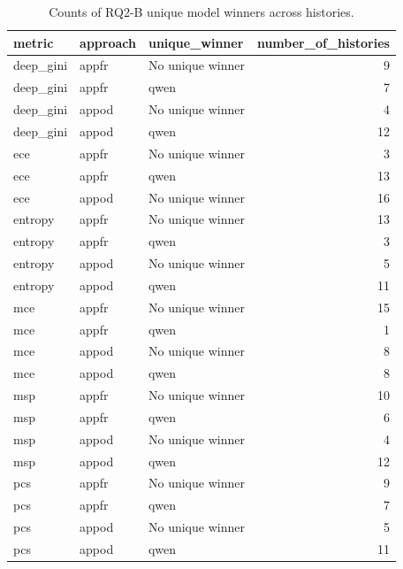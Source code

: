 \begin{table}[tbp]
\caption{Counts of RQ2-B unique model winners across histories.}
\label{tab:rq2b-model-winner-summary}
\begin{tabular}{lllr}
\toprule
metric & approach & unique\_winner & number\_of\_histories \\
\midrule
deep\_gini & appfr & No unique winner & 9 \\
deep\_gini & appfr & qwen & 7 \\
deep\_gini & appod & No unique winner & 4 \\
deep\_gini & appod & qwen & 12 \\
ece & appfr & No unique winner & 3 \\
ece & appfr & qwen & 13 \\
ece & appod & No unique winner & 16 \\
entropy & appfr & No unique winner & 13 \\
entropy & appfr & qwen & 3 \\
entropy & appod & No unique winner & 5 \\
entropy & appod & qwen & 11 \\
mce & appfr & No unique winner & 15 \\
mce & appfr & qwen & 1 \\
mce & appod & No unique winner & 8 \\
mce & appod & qwen & 8 \\
msp & appfr & No unique winner & 10 \\
msp & appfr & qwen & 6 \\
msp & appod & No unique winner & 4 \\
msp & appod & qwen & 12 \\
pcs & appfr & No unique winner & 9 \\
pcs & appfr & qwen & 7 \\
pcs & appod & No unique winner & 5 \\
pcs & appod & qwen & 11 \\
\bottomrule
\end{tabular}
\end{table}
